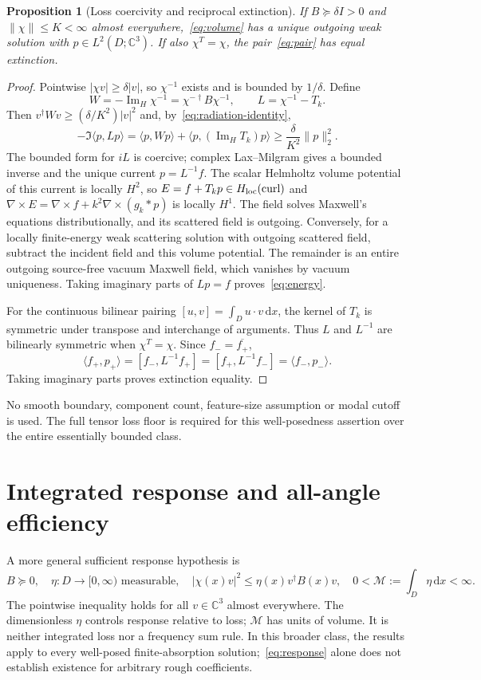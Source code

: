 \documentclass[11pt]{article}
\newtheorem{proposition}[theorem]{Proposition}
\newcommand{\ImH}{\operatorname{Im}_{\!H}}
\newcommand{\dd}{\,\mathrm{d}}
\newcommand{\ip}[2]{\langle #1,#2\rangle}
\newcommand{\bilin}[2]{[#1,#2]}
\newcommand{\norm}[1]{\lVert #1\rVert}
\newcommand{\abs}[1]{\lvert #1\rvert}
\begin{document}
\begin{proposition}[Loss coercivity and reciprocal extinction]\label{prop:coercivity}
If $B\succeq\delta I>0$ and $\norm\chi\leq K<\infty$ almost everywhere,~\eqref{eq:volume} has a unique outgoing weak solution with $p\in L^2(D;\mathbb C^3)$. If also $\chi^T=\chi$, the pair~\eqref{eq:pair} has equal extinction.
\end{proposition}
\begin{proof}
Pointwise $\abs{\chi v}\geq\delta\abs v$, so $\chi^{-1}$ exists and is bounded by $1/\delta$. Define
\[
 W=-\ImH\chi^{-1}=\chi^{-\dagger}B\chi^{-1},\qquad L=\chi^{-1}-T_k.
\]
Then $v^\dagger Wv\geq(\delta/K^2)\abs v^2$ and, by~\eqref{eq:radiation-identity},
\[
 -\Im\ip p{Lp}=\ip p{Wp}+\ip p{(\ImH T_k)p}
 \geq\frac{\delta}{K^2}\norm p_2^2.
\]
The bounded form for $iL$ is coercive; complex Lax--Milgram gives a bounded inverse and the unique current $p=L^{-1}f$. The scalar Helmholtz volume potential of this current is locally $H^2$, so $E=f+T_kp\in H_{\rm loc}(\operatorname{curl})$ and $\nabla\times E=\nabla\times f+k^2\nabla\times(g_k*p)$ is locally $H^1$. The field solves Maxwell's equations distributionally, and its scattered field is outgoing. Conversely, for a locally finite-energy weak scattering solution with outgoing scattered field, subtract the incident field and this volume potential. The remainder is an entire outgoing source-free vacuum Maxwell field, which vanishes by vacuum uniqueness. Taking imaginary parts of $Lp=f$ proves~\eqref{eq:energy}.

For the continuous bilinear pairing $\bilin uv=\int_Du\cdot v\dd x$, the kernel of $T_k$ is symmetric under transpose and interchange of arguments. Thus $L$ and $L^{-1}$ are bilinearly symmetric when $\chi^T=\chi$. Since $f_-=\overline{f_+}$,
\[
 \ip{f_+}{p_+}=\bilin{f_-}{L^{-1}f_+}
 =\bilin{f_+}{L^{-1}f_-}=\ip{f_-}{p_-}.
\]
Taking imaginary parts proves extinction equality.
\end{proof}
No smooth boundary, component count, feature-size assumption or modal cutoff is used. The full tensor loss floor is required for this well-posedness assertion over the entire essentially bounded class.

\section{Integrated response and all-angle efficiency}\label{sec:response}
A more general sufficient response hypothesis is
\begin{equation}\label{eq:response}
 B\succeq0,\quad \eta:D\to[0,\infty)\text{ measurable},\quad
 \abs{\chi(x)v}^2\leq\eta(x)v^\dagger B(x)v,\quad
 0<\mathcal M:=\int_D\eta\dd x<\infty.
\end{equation}
The pointwise inequality holds for all $v\in\mathbb C^3$ almost everywhere. The dimensionless $\eta$ controls response relative to loss; $\mathcal M$ has units of volume. It is neither integrated loss nor a frequency sum rule. In this broader class, the results apply to every well-posed finite-absorption solution;~\eqref{eq:response} alone does not establish existence for arbitrary rough coefficients.
\end{document}
